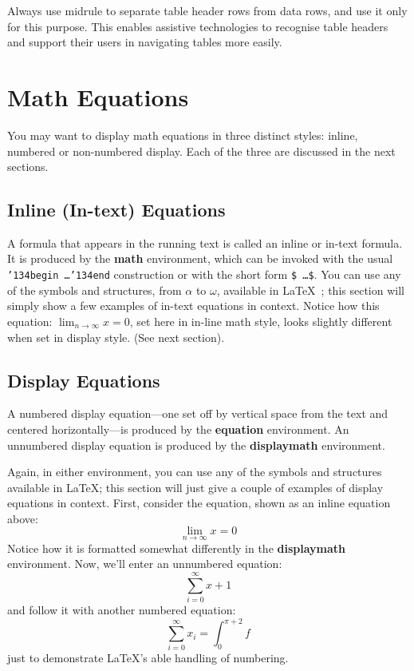 \documentclass[sigconf]{acmart}
\begin{document}
Always use midrule to separate table header rows from data rows, and
use it only for this purpose. This enables assistive technologies to
recognise table headers and support their users in navigating tables
more easily.

\section{Math Equations}
You may want to display math equations in three distinct styles:
inline, numbered or non-numbered display.  Each of the three are
discussed in the next sections.

\subsection{Inline (In-text) Equations}
A formula that appears in the running text is called an inline or
in-text formula.  It is produced by the \textbf{math} environment,
which can be invoked with the usual
\texttt{{\char'134}begin\,\ldots{\char'134}end} construction or with
the short form \texttt{\$\,\ldots\$}. You can use any of the symbols
and structures, from $\alpha$ to $\omega$, available in
\LaTeX~\cite{Lamport:LaTeX}; this section will simply show a few
examples of in-text equations in context. Notice how this equation:
\begin{math}
  \lim_{n\rightarrow \infty}x=0
\end{math},
set here in in-line math style, looks slightly different when
set in display style.  (See next section).

\subsection{Display Equations}
A numbered display equation---one set off by vertical space from the
text and centered horizontally---is produced by the \textbf{equation}
environment. An unnumbered display equation is produced by the
\textbf{displaymath} environment.

Again, in either environment, you can use any of the symbols and
structures available in \LaTeX\@; this section will just give a couple
of examples of display equations in context.  First, consider the
equation, shown as an inline equation above:
\begin{equation}
  \lim_{n\rightarrow \infty}x=0
\end{equation}
Notice how it is formatted somewhat differently in
the \textbf{displaymath}
environment.  Now, we'll enter an unnumbered equation:
\begin{displaymath}
  \sum_{i=0}^{\infty} x + 1
\end{displaymath}
and follow it with another numbered equation:
\begin{equation}
  \sum_{i=0}^{\infty}x_i=\int_{0}^{\pi+2} f
\end{equation}
just to demonstrate \LaTeX's able handling of numbering.
\end{document}
